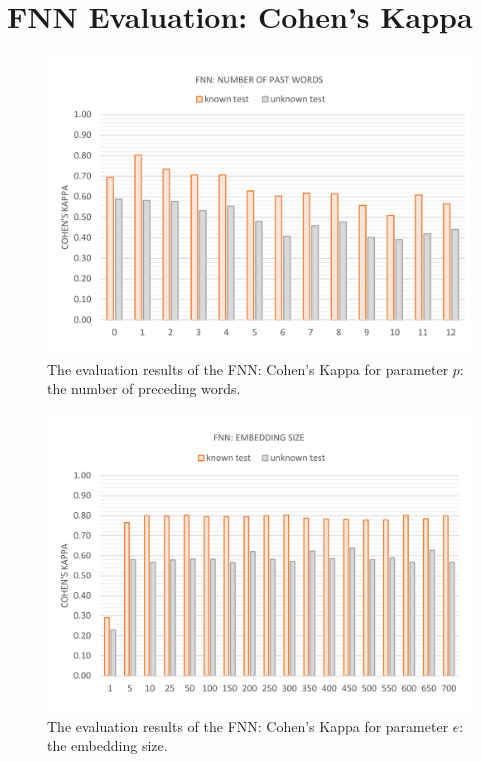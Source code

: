\section{FNN Evaluation: Cohen's Kappa}\label{c.appendix.kappa.fnn}
\vspace{-13mm}
\begin{figure}[H]
	\centering\includegraphics[width=\textwidth]{images/evaluation_fnn_p_k}
	\caption[FNN Evaluation: Number of Past Words]{The evaluation results of the FNN: Cohen's Kappa for parameter $p$: the number of preceding words.}
	\label{f.evaluation.fnn.p.k}
\end{figure}

\vspace{-13mm}
\begin{figure}[H]
	\centering\includegraphics[width=\textwidth]{images/evaluation_fnn_e_k}
	\caption[FNN Evaluation: Number of Past Words]{The evaluation results of the FNN: Cohen's Kappa for parameter $e$: the embedding size.}
	\label{f.evaluation.fnn.e.k}
\end{figure}

